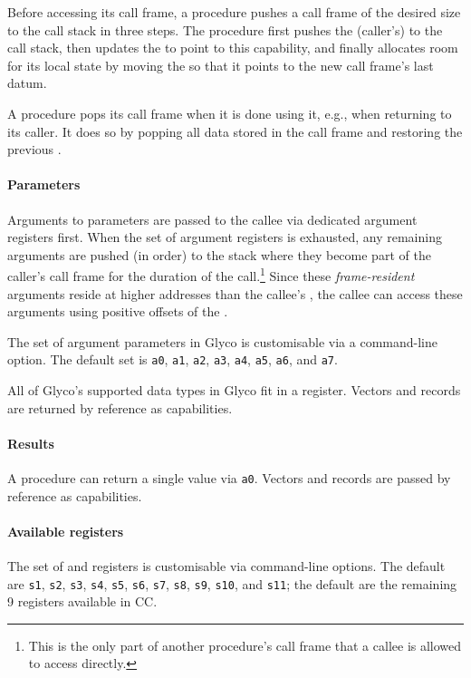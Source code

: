 \documentclass[main.tex]{subfiles}
\begin{document}
Before accessing its call frame, a procedure pushes a call frame of the desired size to the call stack in three steps. The procedure first pushes the (caller's)  to the call stack, then updates the  to point to this capability, and finally allocates room for its local state by moving the  so that it points to the new call frame's last datum.

A procedure pops its call frame when it is done using it, e.g., when returning to its caller. It does so by popping all data stored in the call frame and restoring the previous .

\paragraph{Parameters} Arguments to parameters are passed to the callee via dedicated argument registers first. When the set of argument registers is exhausted, any remaining arguments are pushed (in order) to the stack where they become part of the caller's call frame for the duration of the call.\footnote{This is the only part of another procedure's call frame that a callee is allowed to access directly.} Since these \emph{frame-resident} arguments reside at higher addresses than the callee's , the callee can access these arguments using positive offsets of the .

The set of argument parameters in Glyco is customisable via a command-line option. The default set is \texttt{a0}, \texttt{a1}, \texttt{a2}, \texttt{a3}, \texttt{a4}, \texttt{a5}, \texttt{a6}, and \texttt{a7}.

All of Glyco's supported data types in Glyco fit in a register. Vectors and records are returned by reference as capabilities.

\paragraph{Results} A procedure can return a single value via \texttt{a0}. Vectors and records are passed by reference as capabilities.

\paragraph{Available registers} The set of  and  registers is customisable via command-line options. The default  are \texttt{s1}, \texttt{s2}, \texttt{s3}, \texttt{s4}, \texttt{s5}, \texttt{s6}, \texttt{s7}, \texttt{s8}, \texttt{s9}, \texttt{s10}, and \texttt{s11}; the default  are the remaining 9 registers available in CC.
\end{document}
